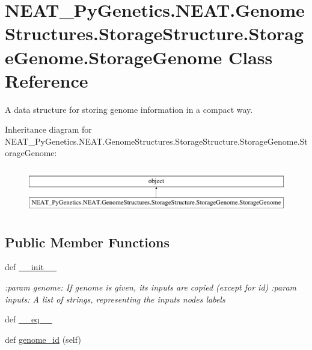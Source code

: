\hypertarget{classNEAT__PyGenetics_1_1NEAT_1_1GenomeStructures_1_1StorageStructure_1_1StorageGenome_1_1StorageGenome}{}\section{N\+E\+A\+T\+\_\+\+Py\+Genetics.\+N\+E\+A\+T.\+Genome\+Structures.\+Storage\+Structure.\+Storage\+Genome.\+Storage\+Genome Class Reference}
\label{classNEAT__PyGenetics_1_1NEAT_1_1GenomeStructures_1_1StorageStructure_1_1StorageGenome_1_1StorageGenome}


A data structure for storing genome information in a compact way.  


Inheritance diagram for N\+E\+A\+T\+\_\+\+Py\+Genetics.\+N\+E\+A\+T.\+Genome\+Structures.\+Storage\+Structure.\+Storage\+Genome.\+Storage\+Genome\+:\begin{figure}[H]
\begin{center}
\leavevmode
\includegraphics[height=2.000000cm]{classNEAT__PyGenetics_1_1NEAT_1_1GenomeStructures_1_1StorageStructure_1_1StorageGenome_1_1StorageGenome}
\end{center}
\end{figure}
\subsection*{Public Member Functions}
\begin{DoxyCompactItemize}
\item 
def \hyperlink{classNEAT__PyGenetics_1_1NEAT_1_1GenomeStructures_1_1StorageStructure_1_1StorageGenome_1_1StorageGenome_a8b7615cf97ad4ce4c3805ecde57637c8}{\+\_\+\+\_\+init\+\_\+\+\_\+}
\begin{DoxyCompactList}\small\item\em \+:param genome\+: If genome is given, its inputs are copied (except for id) \+:param inputs\+: A list of strings, representing the inputs nodes\textquotesingle{} labels \end{DoxyCompactList}\item 
def \hyperlink{classNEAT__PyGenetics_1_1NEAT_1_1GenomeStructures_1_1StorageStructure_1_1StorageGenome_1_1StorageGenome_a0d0ae3acf7162d05cb40fe5eaff9ada9}{\+\_\+\+\_\+eq\+\_\+\+\_\+}
\item 
def \hyperlink{classNEAT__PyGenetics_1_1NEAT_1_1GenomeStructures_1_1StorageStructure_1_1StorageGenome_1_1StorageGenome_a536876e28c6ee27477de23a369e11daa}{genome\+\_\+id} (self)
\end{DoxyCompactItemize}
